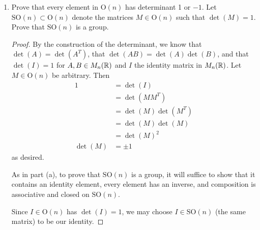 \documentclass[../psets.tex]{subfiles}
\begin{document}
\begin{enumerate}
\begin{enumerate}
\begin{proof}
\begin{align*}
                &= \sum_{k=1}^n\sum_{k'=1}^na_{ik'}b_{k'k}c_{kj}\\
                &= \sum_{k=1}^n\sum_{k'=1}^na_{ik}b_{kk'}c_{k'j}\\
                &= \sum_{k=1}^na_{ik}\left( \sum_{k'=1}^nb_{kk'}c_{k'j} \right)\\
                &= \sum_{k=1}^na_{ik}bc_{kj}\\
                &= a(bc)_{ij}
            \end{align*}
            Therefore, composition is associative.\par
            Suppose $A,B\in\text{O}(n)$. Then since
            \begin{equation*}
                (AB)(AB)^T = ABB^TA^T
                = AIA^T
                = AA^T
                = I
            \end{equation*}
            we have that $\text{O}(n)$ is closed under composition, as desired.
        \end{proof}
        \item Prove that every element in $\text{O}(n)$ has determinant 1 or $-1$. Let $\text{SO}(n)\subset\text{O}(n)$ denote the matrices $M\in\text{O}(n)$ such that $\det(M)=1$. Prove that $\text{SO}(n)$ is a group.
        \begin{proof}
            By the construction of the determinant, we know that $\det(A)=\det(A^T)$, that $\det(AB)=\det(A)\det(B)$, and that $\det(I)=1$ for $A,B\in M_n(\mathbb{R})$ and $I$ the identity matrix in $M_n(\mathbb{R})$. Let $M\in\text{O}(n)$ be arbitrary. Then
            \begin{align*}
                1 &= \det(I)\\
                &= \det(MM^T)\\
                &= \det(M)\det(M^T)\\
                &= \det(M)\det(M)\\
                &= \det(M)^2\\
                \det(M) &= \pm 1
            \end{align*}
            as desired.\par\smallskip
            As in part (a), to prove that $\text{SO}(n)$ is a group, it will suffice to show that it contains an identity element, every element has an inverse, and composition is associative and closed on $\text{SO}(n)$.\par
            Since $I\in\text{O}(n)$ has $\det(I)=1$, we may choose $I\in\text{SO}(n)$ (the same matrix) to be our identity.\par

\end{proof}
\end{enumerate}
\end{enumerate}
\end{document}
